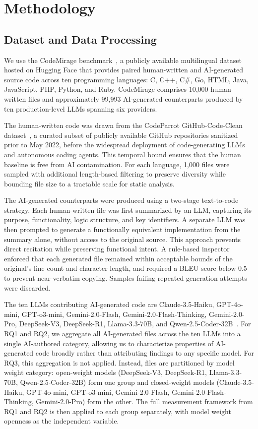 \section{Methodology}
\label{sec:methodology}

\subsection{Dataset and Data Processing}
\label{sec:dataset-processing}

We use the CodeMirage benchmark~\cite{codemirage2024}, a publicly available multilingual dataset hosted on Hugging Face that provides paired human-written and AI-generated source code across ten programming languages: C, C++, C\#, Go, HTML, Java, JavaScript, PHP, Python, and Ruby. CodeMirage comprises 10,000 human-written files and approximately 99,993 AI-generated counterparts produced by ten production-level LLMs spanning six providers.

The human-written code was drawn from the CodeParrot GitHub-Code-Clean dataset~\cite{codeparrot2022}, a curated subset of publicly available GitHub repositories sanitized prior to May 2022, before the widespread deployment of code-generating LLMs and autonomous coding agents. This temporal bound ensures that the human baseline is free from AI contamination. For each language, 1,000 files were sampled with additional length-based filtering to preserve diversity while bounding file size to a tractable scale for static analysis.

The AI-generated counterparts were produced using a two-stage text-to-code strategy. Each human-written file was first summarized by an LLM, capturing its purpose, functionality, logic structure, and key identifiers. A separate LLM was then prompted to generate a functionally equivalent implementation from the summary alone, without access to the original source. This approach prevents direct recitation while preserving functional intent. A rule-based inspector enforced that each generated file remained within acceptable bounds of the original's line count and character length, and required a BLEU score below 0.5 to prevent near-verbatim copying. Samples failing repeated generation attempts were discarded.

The ten LLMs contributing AI-generated code are Claude-3.5-Haiku, GPT-4o-mini, GPT-o3-mini, Gemini-2.0-Flash, Gemini-2.0-Flash-Thinking, Gemini-2.0-Pro, DeepSeek-V3, DeepSeek-R1, Llama-3.3-70B, and Qwen-2.5-Coder-32B~\cite{codemirage2024}. For RQ1 and RQ2, we aggregate all AI-generated files across the ten LLMs into a single AI-authored category, allowing us to characterize properties of AI-generated code broadly rather than attributing findings to any specific model. For RQ3, this aggregation is not applied. Instead, files are partitioned by model weight category: open-weight models (DeepSeek-V3, DeepSeek-R1, Llama-3.3-70B, Qwen-2.5-Coder-32B) form one group and closed-weight models (Claude-3.5-Haiku, GPT-4o-mini, GPT-o3-mini, Gemini-2.0-Flash, Gemini-2.0-Flash-Thinking, Gemini-2.0-Pro) form the other. The full measurement framework from RQ1 and RQ2 is then applied to each group separately, with model weight openness as the independent variable.

